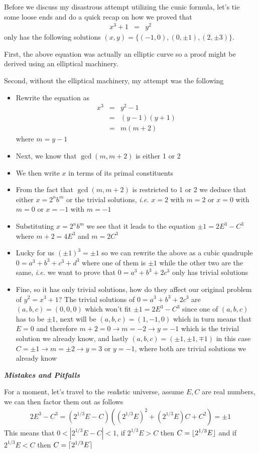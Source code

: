 \documentclass[aps,preprint,preprintnumbers,nofootinbib,showpacs,prd]{revtex4-1}
\newcommand{\ie}{{\it i.e.} }
\newcommand{\bit}{\begin{itemize}}
\newcommand{\eit}{\end{itemize}}
\newcommand{\nbea}{\begin{eqnarray*}}
\newcommand{\neea}{\end{eqnarray*}}
\DeclarePairedDelimiter{\ceil}{\lceil}{\rceil}
\DeclarePairedDelimiter{\floor}{\lfloor}{\rfloor}
\begin{document}
Before we discuss my disastrous attempt utilizing the cunic formula, let's tie some loose ends and do a quick recap on how we proved that
%
\nbea
x^3 + 1 & = & y^2
\neea
%
only has the following solutions $(x,y) = \{(-1,0), (0,\pm1), (2,\pm3)\}$.

First, the above equation was actually an elliptic curve so a proof might be derived using an elliptical machinery.

Second, without the elliptical machinery, my attempt was the following
\bit
\item Rewrite the equation as 
%
\nbea
x^3 & = & y^2 - 1\\
& = & (y-1)(y+1)\\
& = & m(m+2)
\neea
%
where $m = y-1$
\item Next, we know that $\gcd(m,m+2)$ is either 1 or 2
\item We then write $x$ in terms of its primal constituents
\item From the fact that $\gcd(m,m+2)$ is restricted to 1 or 2 we deduce that either $x = 2^n b^m$ or the trivial solutions, \ie $x = 2$ with $m = 2$ or $x = 0$ with $m = 0$ or $x = -1$ with $m = -1$
\item Substituting $x = 2^n b^m$ we see that it leads to the equation $\pm 1 = 2E^3 - C^3$ where $m + 2 = 4E^3$ and $m = 2C^3$
\item Lucky for us $(\pm1)^3 = \pm 1$ so we can rewrite the above as a cubic quadruple $0 = a^3 + b^3 + c^3 + d^3$ where one of them is $\pm1$ while the other two are the same, \ie we want to prove that $0 = a^3 + b^3 + 2c^3$ only has trivial solutions
\item Fine, so it has only trivial solutions, how do they affect our original problem of $y^2 = x^3 + 1$? The trivial solutions of $0 = a^3 + b^3 + 2c^3$ are $(a,b,c) = (0,0,0)$ which won't fit $\pm 1 = 2E^3 - C^3$ since one of $(a,b,c)$ has to be $\pm 1$, next will be $(a,b,c) = (1,-1,0)$ which in turn means that $E = 0$ and therefore $m+2 = 0 \to m = -2 \to y = -1$ which is the trivial solution we already know, and lastly $(a,b,c) = (\pm1,\pm1,\mp1)$ in this case $C = \pm 1 \to m = \pm 2 \to y = 3$ or $y = -1$, where both are trivial solutions we already know
\eit

\bigskip
\textit{\textbf{Mistakes and Pitfalls}}
\smallskip

For a moment, let's travel to the {\it real}istic universe, assume $E, C$ are real numbers, we can then factor them out as follows
%
\nbea
2 E^3 - C^3 = (2^{1/3}E - C)((2^{1/3}E)^2 + (2^{1/3}E)C + C^2) = \pm 1
\neea
%
This means that $0 < |2^{1/3}E - C| < 1$, if $2^{1/3}E > C$ then $C = \floor{2^{1/3}E}$ and if $2^{1/3}E < C$ then $C = \ceil{2^{1/3}E}$
\end{document}
